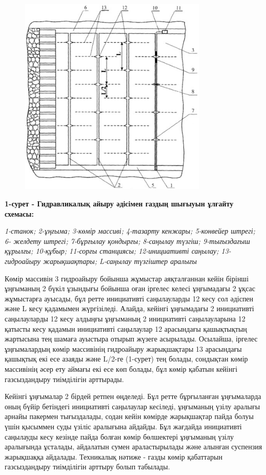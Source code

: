 \begin{figure}[H]
	\centering
	\includegraphics[width=0.8\textwidth]{assets/1133}
	\caption*{}
\end{figure}

{\bfseries 1-сурет - Гидравликалық айыру әдісімен газдың шығыуын ұлғайту
схемасы:}

\emph{1-станок; 2-ұңғыма; 3-көмір массиві; 4-тазарту кенжары; 5-конвейер
штрегі; 6- желдету штрегі; 7-бұрғылау қондырғы; 8-саңылау түзгіш;
9-тығыздағыш құрылғы; 10-құбыр; 11-сорғы станциясы; 12-инициативті
саңылау; 13-гидроайыру жарықшақтары; L-саңылау түзгіштер аралығы}

Көмір массивін 3 гидроайыру бойынша жұмыстар аяқталғаннан кейін бірінші
ұңғыманың 2 бүкіл ұзындығы бойынша оған іргелес келесі ұңғымадағы 2
ұқсас жұмыстарға ауысады, бұл ретте инициативті саңылауларды 12 кесу сол
әдіспен және L кесу қадамымен жүргізіледі. Алайда, кейінгі ұңғымадағы 2
инициативті саңылауларды 12 кесу алдыңғы ұңғыманың 2 инициативті
саңылауларына 12 қатысты кесу қадамын инициативті саңылаулар 12
арасындағы қашықтықтың жартысына тең шамаға ауыстыра отырып жүзеге
асырылады. Осылайша, іргелес ұңғымалардың көмір массивінің гидроайыру
жарықшақтары 13 арасындағы қашықтық екі есе азаяды және L/2-ге (1-сурет)
тең болады, сондықтан көмір массивінің әсер ету аймағы екі есе көп
болады, бұл көмір қабатын кейінгі газсыздандыру тиімділігін арттырады.

Кейінгі ұңғымалар 2 бірдей ретпен өңделеді. Бұл ретте бұрғыланған
ұңғымаларда оның бүйір бетіндегі инициативті саңылаулар кесіледі,
ұңғыманың үзілу аралығы арнайы пакермен тығыздалады, содан кейін көмірде
жарықшақтар пайда болуы үшін қысыммен суды үзіліс аралығына айдайды. Бұл
жағдайда инициативті саңылауды кесу кезінде пайда болған көмір
бөлшектері ұңғыманың үзілу аралығында ұсталады, айдалатын сумен
араластырылады және алынған суспензия жарықшаққа айдалады. Техникалық
нәтиже - газды көмір қабаттарын газсыздандыру тиімділігін арттыру болып
табылады.

